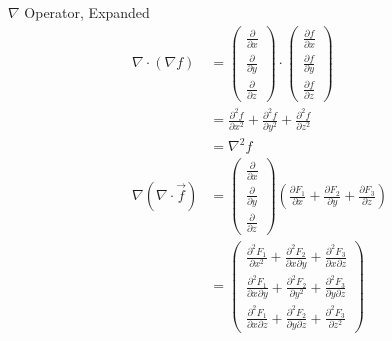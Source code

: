 \documentclass[8pt]{extarticle}
\begin{document}
  \begin{problem}{$\nabla$ Operator, Expanded}
    \begin{align*}
      \nabla \cdot (\nabla f) &= \begin{pmatrix}\frac{\partial}{\partial x}\\\frac{\partial}{\partial y}\\\frac{\partial}{\partial z}\end{pmatrix}\cdot \begin{pmatrix}\frac{\partial f}{\partial x}\\\frac{\partial f}{\partial y}\\\frac{\partial f}{\partial z}\end{pmatrix}\\
                              &= \frac{\partial^2 f}{\partial x^2} + \frac{\partial^2 f}{\partial y^2} + \frac{\partial^2f}{\partial z^2}\\
                              &= \nabla^2 f\\
      \nabla(\nabla \cdot \vec{f}) &= \begin{pmatrix}\frac{\partial}{\partial x}\\\frac{\partial}{\partial y}\\\frac{\partial}{\partial z}\end{pmatrix} \left(\frac{\partial F_1}{\partial x} + \frac{\partial F_2}{\partial y} + \frac{\partial F_3}{\partial z}\right)\\
                                   &= \begin{pmatrix}\frac{\partial^2F_1}{\partial x^2} + \frac{\partial ^2F_2}{\partial x \partial y} + \frac{\partial^2 F_3}{\partial x \partial z}\\
                                    \frac{\partial^2F_1}{\partial x \partial y} + \frac{\partial ^2F_2}{\partial y^2} + \frac{\partial^2 F_3}{\partial y \partial z}\\
                                    \frac{\partial^2F_1}{\partial x \partial z} + \frac{\partial ^2F_2}{\partial y \partial z} + \frac{\partial^2 F_3}{\partial z^2}
                                   \end{pmatrix}
    \end{align*}
  \end{problem}
\end{document}

